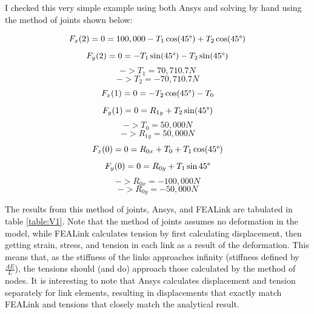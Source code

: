 \documentclass[11pt, oneside]{article}   	%
\begin{document}
I checked this very simple example using both Ansys and solving by hand using the method of joints shown below:

\begin{equation}
F_x(2) = 0 = 100,000 - T_1\cos(45\degree) + T_2\cos(45\degree)
\end{equation}
\begin{equation}
F_y(2) = 0 = -T_1\sin(45\degree) - T_2\sin(45\degree)
\end{equation}
\begin{equation}
-> T_1 = 70,710.7 N
\end{equation}
\begin{equation}
-> T_2 = -70,710.7 N 
\end{equation}
\begin{equation}
F_x(1) = 0 = -T_2\cos(45\degree) - T_0
\end{equation}
\begin{equation}
F_y(1) = 0 = R_{1y} + T_2\sin(45\degree)
\end{equation}
\begin{equation}
-> T_0 = 50,000 N
\end{equation}
\begin{equation}
-> R_{1y} = 50,000 N
\end{equation}
\begin{equation}
F_x(0) = 0 = R_{0x} + T_0 + T_1\cos(45\degree)
\end{equation}
\begin{equation}
F_y(0) = 0 = R_{0y} + T_1\sin{45\degree}
\end{equation}
\begin{equation}
-> R_{0x} = -100,000 N
\end{equation}
\begin{equation}
 -> R_{0y} = -50,000 N
\end{equation}

The results from this method of joints, Ansys, and FEALink are tabulated in table \ref{table:V1}.  Note that the method of joints assumes no deformation in the model, while FEALink calculates tension by first calculating displacement, then getting strain, stress, and tension in each link as a result of the deformation.  This means that, as the stiffness of the links approaches infinity (stiffness defined by $\frac{AE}{L}$), the tensions should (and do) approach those calculated by the method of nodes.  It is interesting to note that Ansys calculates displacement and tension separately for link elements, resulting in displacements that exactly match FEALink and tensions that closely match the analytical result.  
\end{document}
